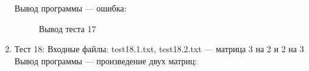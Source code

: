 \documentclass[12pt, a4paper]{article}
\begin{document}
\begin{enumerate}
	Вывод программы --- ошибка:
	\begin{figure}[h]
  		\caption{Вывод теста 17}
	\end{figure}
	\newpage
	\item Тест 18: Входные файлы: test18.1.txt, 
	test18.2.txt --- матрица 3 на 2 и 2 на 3
	Вывод программы --- произведение двух матриц:
	\begin{figure}[h]

\end{figure}
\end{enumerate}
\end{document}
